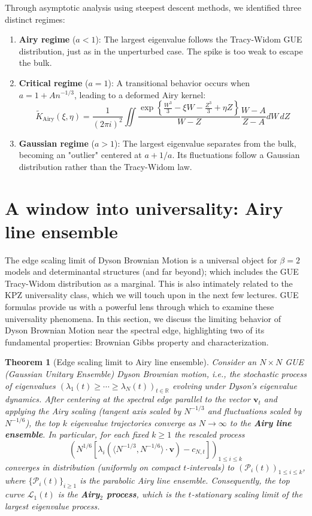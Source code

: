 \documentclass[letterpaper,11pt,oneside,reqno]{book}
\numberwithin{equation}{chapter}  %
\newtheorem{theorem}[proposition]{Theorem}
\theoremstyle{definition}
\begin{document}
Through asymptotic analysis using steepest descent methods, we identified three distinct regimes:

\begin{enumerate}
\item \textbf{Airy regime} ($a < 1$): The largest eigenvalue follows the Tracy-Widom GUE distribution, just as in the unperturbed case. The spike is too weak to escape the bulk.

\item \textbf{Critical regime} ($a = 1$): A transitional behavior occurs when $a = 1 + An^{-1/3}$, leading to a deformed Airy kernel:
\begin{equation}
\tilde{K}_{\text{Airy}}(\xi,\eta) = \frac{1}{(2\pi i)^2}\iint \frac{\exp\left\{\frac{W^3}{3}-\xi W-\frac{Z^3}{3}+\eta Z\right\}}{W-Z} \frac{W-A}{Z-A} dW\,dZ
\end{equation}

\item \textbf{Gaussian regime} ($a > 1$): The largest eigenvalue separates from the bulk, becoming an "outlier" centered at $a + 1/a$. Its fluctuations follow a Gaussian distribution rather than the Tracy-Widom law.
\end{enumerate}

\section{A window into universality: Airy line ensemble}

The edge scaling limit of Dyson Brownian Motion is a universal object for $\beta=2$ models and determinantal structures (and far beyond); which includes the GUE Tracy-Widom distribution as a marginal. This is also intimately related to the KPZ universality class, which we will touch upon in the next few lectures.
GUE formulas
provide us with a powerful lens through which to examine these universality phenomena. In this section, we discuss the limiting behavior of Dyson Brownian Motion near the spectral edge, highlighting two of its fundamental properties: Brownian Gibbs property and characterization.

\begin{theorem}[Edge scaling limit to Airy line ensemble]
	Consider an $N\times N$ GUE (Gaussian Unitary Ensemble) Dyson Brownian motion, i.e., the stochastic process of eigenvalues $(\lambda_1(t)\ge \cdots\ge \lambda_N(t))_{t\in\mathbb{R}}$ evolving under Dyson's eigenvalue dynamics. After centering at the spectral edge parallel to the vector $\mathbf{v}_t$ and applying the
Airy scaling (tangent axis scaled by $N^{-1/3}$ and fluctuations scaled by $N^{-1/6}$), the top $k$ eigenvalue trajectories converge as $N\to\infty$ to the \textbf{Airy line ensemble}. In particular, for each fixed $k\ge1$ the rescaled process $$(N^{1/6}[\lambda_i(\langle
			N^{-1/3},N^{-1/6}
\rangle \cdot \mathbf{v})-c_{N,t}])_{1\le i\le k}$$ converges in distribution (uniformly on compact $t$-intervals) to $(\mathcal{P}_i(t))_{1\le i\le k}$, where $\{\mathcal{P}_i(t)\}_{i\ge1}$ is the parabolic Airy line ensemble. Consequently, the top curve $\mathcal{L}_1(t)$ is the \textbf{Airy$_2$ process}, which is the $t$-stationary scaling limit of the largest eigenvalue process.
\end{theorem}
\end{document}
